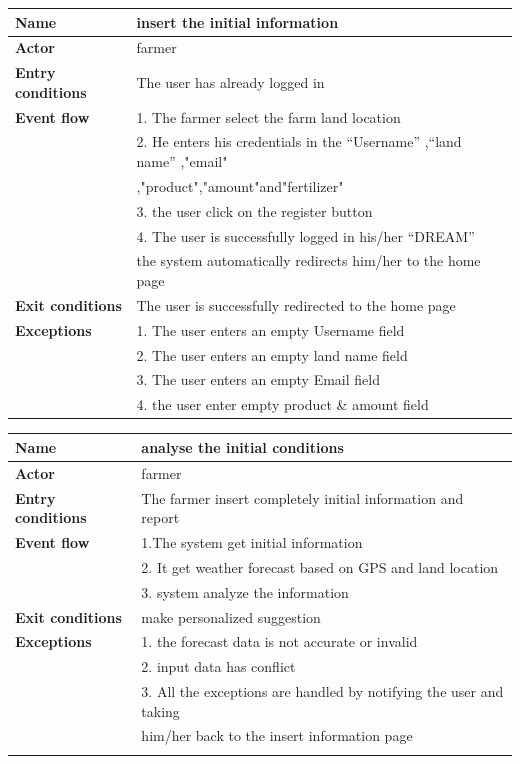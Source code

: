 \begin{table}[H]
\begin{tabular}{|l|l|}
\hline
\normalsize	
\textbf{Name} & insert the initial information \\\hline
\textbf{Actor} & farmer\\\hline
\textbf{Entry conditions}& The user has already logged in\\\hline
\textbf{Event flow} &1. The farmer select the farm land location\\&
2. He enters his credentials in the “Username” ,“land name” ,"email"\\& 
,"product","amount"and"fertilizer"\\&
3. the user click on  the register button\\&
4. The user is successfully logged in his/her “DREAM”\\&
the system automatically redirects him/her to the home page\\\hline
\textbf{Exit conditions} & The user is successfully redirected to the home page \\\hline
\textbf{Exceptions }& 
1. The user enters an empty Username field\\&
2. The user enters an empty land name field\\&
3. The user enters an empty Email field\\&
4. the user enter empty product \& amount field\\\hline
\end{tabular}
\end{table}




\begin{table}[H]
\begin{tabular}{|l|l|}
\hline
\normalsize	
\textbf{Name} & analyse  the initial conditions\\\hline
\textbf{Actor} & farmer\\\hline
\textbf{Entry conditions} & The farmer insert completely initial information and report \\\hline
\textbf{Event flow}  &  1.The system get initial information\\&
2. It get weather forecast based on GPS and land location \\&
3. system analyze the information \\\hline
\textbf{Exit conditions} & make personalized suggestion \\\hline
\textbf{Exceptions }& 
1. the forecast data is not accurate or invalid \\&
2. input data has conflict\\&
3. All the exceptions are handled by notifying the user and taking\\&
him/her back to the insert information page\\&
\\\hline
\end{tabular}
\end{table}


